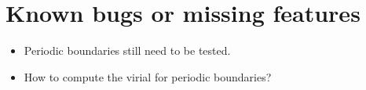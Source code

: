 \section*{Known bugs or missing features}

\begin{itemize}
  \item Periodic boundaries still need to be tested.
  \item How to compute the virial for periodic boundaries?
\end{itemize}

